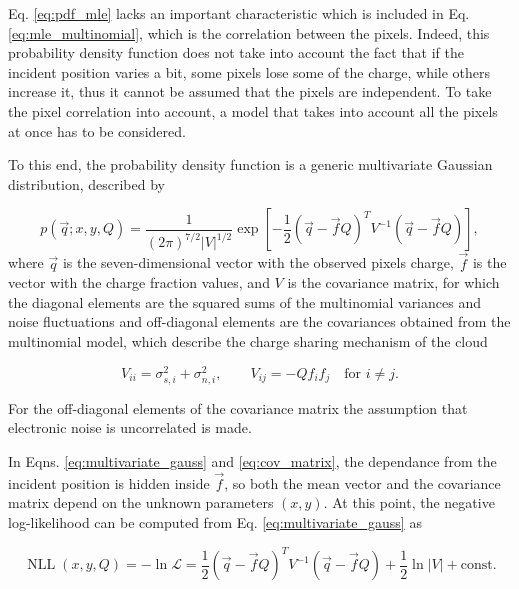 Eq. \ref{eq:pdf_mle} lacks an important characteristic which is included in Eq. \ref{eq:mle_multinomial}, which is the correlation between the pixels. Indeed, this probability density function does not take into account the fact that if the incident position varies a bit, some pixels lose some of the charge, while others increase it, thus it cannot be assumed that the pixels are independent. To take the pixel correlation into account, a model that takes into account all the pixels at once has to be considered.

To this end, the probability density function is a generic multivariate Gaussian distribution, described by

\begin{equation}
p(\vec{q}; x, y, Q) = \frac{1}{(2 \pi)^{7/2} |V|^{1/2}} \exp{\left[ -\frac{1}{2}(\vec{q} - \vec{f}Q)^{T} V^{-1} (\vec{q} - \vec{f}Q) \right]},
\label{eq:multivariate_gauss}
\end{equation}
where $\vec{q}$ is the seven-dimensional vector with the observed pixels charge, $\vec{f}$ is the vector with the charge fraction values, and $V$ is the covariance matrix, for which the diagonal elements are the squared sums of the multinomial variances and noise fluctuations and off-diagonal elements are the covariances obtained from the multinomial model, which describe the charge sharing mechanism of the cloud

\begin{equation}
V_{ii} = \sigma^2_{s,i} + \sigma^2_{n,i}, \quad \quad V_{ij} = - Q f_i f_j \quad \textrm{for } i \neq j.
\label{eq:cov_matrix}
\end{equation}

For the off-diagonal elements of the covariance matrix the assumption that electronic noise is uncorrelated is made.

In Eqns. \ref{eq:multivariate_gauss} and \ref{eq:cov_matrix}, the dependance from the incident position is hidden inside $\vec{f}$, so both the mean vector and the covariance matrix depend on the unknown parameters $(x, y)$. At this point, the negative log-likelihood can be computed from Eq. \ref{eq:multivariate_gauss} as

\begin{equation}
\operatorname{NLL}(x, y, Q) = -\ln \mathcal{L} = \frac{1}{2}(\vec{q} - \vec{f}Q)^{T} V^{-1} (\vec{q} - \vec{f}Q) +  \frac{1}{2} \ln |V| + \textrm{const.}
\label{eq:nll_multivariate}
\end{equation}

